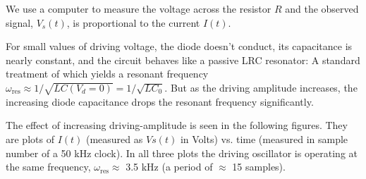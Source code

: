 \documentclass{../lab}
\begin{document}
We use a computer to measure the voltage across the resistor $R$ and the observed signal, $V_s(t)$, is proportional to the current $I(t)$.

For small values of driving voltage, the diode doesn't conduct, its capacitance is nearly constant, and the circuit behaves like a passive LRC resonator: A standard treatment of which yields a resonant frequency $\omega_\text{res} \approx 1/\sqrt{LC( V_d = 0)} = 1/\sqrt{LC_0}$. But as the driving amplitude increases, the increasing diode capacitance drops the resonant frequency significantly.

The effect of increasing driving-amplitude is seen in the following figures. They are plots of $I(t)$ (measured as $Vs(t)$ in Volts) vs. time (measured in sample number of a 50 kHz clock). In all three plots the driving oscillator is operating at the same frequency, $\omega_\text{res} \approx$ 3.5 kHz (a period of $\approx$ 15 samples).
\end{document}
